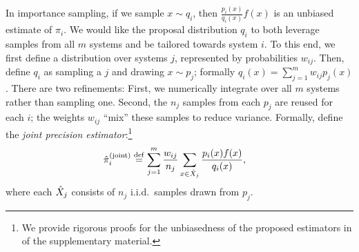 In importance sampling, if we sample $x \sim q_i$, then $\frac{p_i(x)}{q_i(x)} f(x)$ is an unbiased estimate of $\pi_i$.
We would like the proposal distribution $q_i$ to both leverage samples from all $m$ systems and be tailored towards system $i$.
To this end, we first define a distribution over systems $j$, represented by probabilities $w_{ij}$.
Then, define $q_i$ as sampling a $j$ and drawing $x \sim p_j$;
formally $q_i(x) = \sum_{j=1}^m w_{ij} p_j(x)$.
There are two refinements:
First, we numerically integrate over all $m$ systems rather than sampling one.
Second, the $n_j$ samples from each $p_j$ are reused for each $i$;
the weights $w_{ij}$ ``mix'' these samples to reduce variance.
Formally, define the \emph{joint precision estimator}:\footnote{We provide rigorous proofs for the
unbiasedness of the proposed estimators in  of the
supplementary material.}
\begin{align}
  {\hat{\pi}}_i^{\text{(joint)}} &\stackrel{\rm def}{=} \sum_{j=1}^m \frac{w_{ij}}{n_{j}} \sum_{x \in {\hat{X}}_j} \frac{p_i(x) f(x)}{q_i(x)},
\end{align}
where each ${\hat{X}}_j$ consists of $n_j$ i.i.d.~samples drawn from $p_j$.



